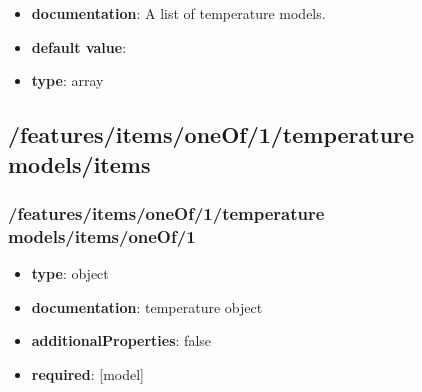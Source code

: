 \begin{itemize}\item {\bf documentation}: A list of temperature models.
\item {\bf default value}: 
\item {\bf type}: array
\end{itemize}\subsection{/features/items/oneOf/1/temperature models/items}

\subsubsection{/features/items/oneOf/1/temperature models/items/oneOf/1}
\begin{itemize}\item {\bf type}: object
\item {\bf documentation}: temperature object
\item {\bf additionalProperties}: false
\item {\bf required}: [model]\end{itemize}
